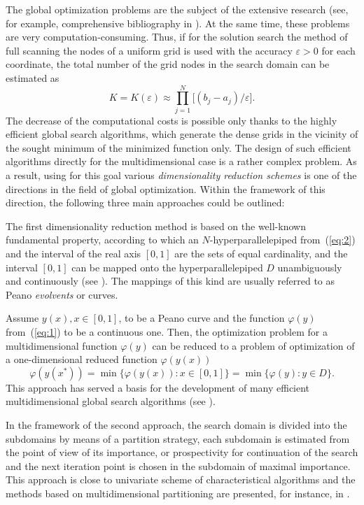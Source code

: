 \documentclass[smallextended]{svjour3}
\let\origref\ref
\renewcommand{\ref}[1]{(\origref{#1})}
\begin{document}
The global optimization problems are the subject of the extensive research (see, for example, comprehensive bibliography in \cite{Ref4, Ref5, Ref14, Ref15, Ref16, Ref22, Ref23, Ref24, Ref33, Ref36, Ref37, Ref38, Ref39}). At the same time, these problems are very computation-consuming. Thus, if  for the solution search  the method of full scanning the nodes of a uniform grid is used with the accuracy $\varepsilon > 0$ for each coordinate, the total number of the grid nodes in the search domain can be estimated as
%
\begin{equation*}
K = K(\varepsilon) \approx \prod\limits_{j = 1}^N \big[ (b_j - a_j) / \varepsilon \big].
\end{equation*}
%
The decrease of the computational costs is possible only thanks to the highly efficient global search algorithms, which generate the dense grids in the vicinity of the sought minimum of the minimized function only. The design of such efficient algorithms directly for the multidimensional case is a rather complex problem. As a result, using for this goal various \textit{dimensionality reduction schemes} is one of the directions in the field of global optimization. Within the framework of this direction, the following three main approaches could be outlined:

The first dimensionality reduction method is based on the well-known fundamental property, according to which an $N$-hyperparallelepiped from~\ref{eq:2} and the interval of the real axis $[0, 1]$ are the sets of equal cardinality, and the interval $[0, 1]$ can be mapped onto the hyperparallelepiped $D$ unambiguously and continuously (see \cite{Ref1, Ref30, Ref36}). The mappings of this kind are usually referred to as Peano \textit{evolvents} or curves.

Assume $y(x), x \in [0, 1]$, to be a Peano curve and the function $\varphi(y)$ from~\ref{eq:1} to be a continuous one. Then, the optimization problem for a multidimensional function $\varphi(y)$ can be reduced to a problem of optimization of a one-dimensional reduced function $\varphi(y(x))$
%
\begin{equation*}
\varphi(y(x^*)) = \min \{ \varphi(y(x)): x \in [0, 1] \} = \min \{ \varphi(y): y \in D \}.
\end{equation*}
This approach has served a basis for the development of many efficient multidimensional global search algorithms (see \cite{Ref9, Ref11, Ref13, Ref30, Ref34, Ref36}).

In the framework of the second approach, the search domain is divided into the subdomains by means of a partition strategy, each subdomain is estimated from the point of view of its importance, or prospectivity for continuation of the search and the next iteration point is chosen in the subdomain of maximal importance. This approach is close to univariate scheme of characteristical algorithms \cite{Ref11} and the methods based on multidimensional partitioning are presented, for instance, in \cite{Ref17, Ref19, Ref20, Ref21, Ref22, Ref23, Ref24}.
\end{document}
